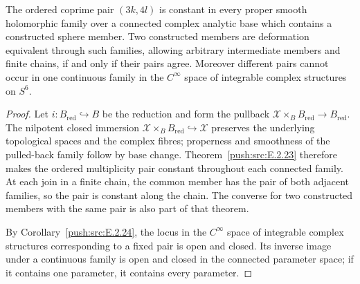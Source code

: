 \begin{corollary}\hypertarget{tag-033C}{}\label{push:src:E.2.4}

The ordered coprime pair $(3k,4l)$ is constant in every
proper smooth holomorphic family over a connected complex
analytic base which contains a constructed sphere member.
Two constructed members are deformation equivalent through
such families, allowing arbitrary intermediate members and
finite chains, if and only if their pairs agree.
Moreover different pairs cannot occur in one continuous
family in the $C^\infty$ space of integrable complex
structures on $S^6$.
\end{corollary}


\begin{proof}
Let $i:B_{\mathrm{red}}\hookrightarrow B$ be the reduction and form the
pullback $\mathcal X\times_B B_{\mathrm{red}}\to B_{\mathrm{red}}$.
The nilpotent closed immersion
$\mathcal X\times_B B_{\mathrm{red}}\hookrightarrow\mathcal X$
preserves the underlying topological spaces and the complex fibres;
properness and smoothness of the pulled-back family follow by base change. Theorem~\ref{push:src:E.2.23} therefore makes
the ordered multiplicity pair constant throughout each connected family.
At each join in a finite chain, the common member has the pair of both
adjacent families, so the pair is constant along the chain. The converse
for two constructed members with the same pair is also part of that theorem.

By Corollary~\ref{push:src:E.2.24}, the locus in the $C^\infty$ space of
integrable complex structures corresponding to a fixed pair is open and
closed. Its inverse image under a continuous family is open and closed
in the connected parameter space; if it contains one parameter, it
contains every parameter.
\end{proof}
